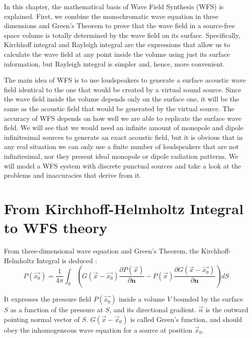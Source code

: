 In this chapter, the mathematical basis of Wave Field Synthesis (WFS) is explained. First, we combine the monochromatic wave equation in three dimensions and Green's Theorem to prove that the wave field in a source-free space volume is totally determined by the wave field on its surface. Specifically, Kirchhoff integral and Rayleigh integral are the expressions that allow us to calculate the wave field at any point inside the volume using just its surface information, but Rayleigh integral is simpler and, hence, more convenient. %

The main idea of WFS is to use loudspeakers to generate a surface acoustic wave field identical to the one that would be created by a virtual sound source. Since the wave field inside the volume depends only on the surface one, it will be the same as the acoustic field that would be generated by the virtual source. The accuracy of WFS depends on how well we are able to replicate the surface wave field. We will see that we would need an infinite amount of monopole and dipole infinitesimal sources to generate an exact acoustic field, but it is obvious that in any real situation we can only use a finite number of loudspeakers that are not infinitesimal, nor they present ideal monopole or dipole radiation patterns. We will model a WFS system with discrete punctual sources and take a look at the problems and inaccuracies that derive from it.

\section{From Kirchhoff-Helmholtz Integral to WFS theory}
From three-dimensional wave equation and Green's Theorem, the Kirchhoff-Helmholtz Integral is deduced \cite{BerkhoutSeismic}:
\begin{equation}
P(\vec{x_0}) = \frac{1}{4\pi} \int_{S} \left(G(\vec{x} - \vec{x_0}) \frac{\partial P(\vec{x})}{\partial \mathbf{n}} - P(\vec{x})\frac{\partial G(\vec{x} - \vec{x_0})}{\partial \mathbf{n}} \right) dS
\label{KirchhoffHelmholtz}
\end{equation}

It expresses the pressure field $P(\vec{x_0})$ inside a volume $V$ bounded by the surface $S$ as a function of the pressure at $S$, and its directional gradient. $\vec{n}$ is the outward pointing normal vector of $S$. $G(\vec{x} - \vec{x}_0)$ is called Green's function, and should obey the inhomogeneous wave equation for a source at position $\vec{x}_0$.

